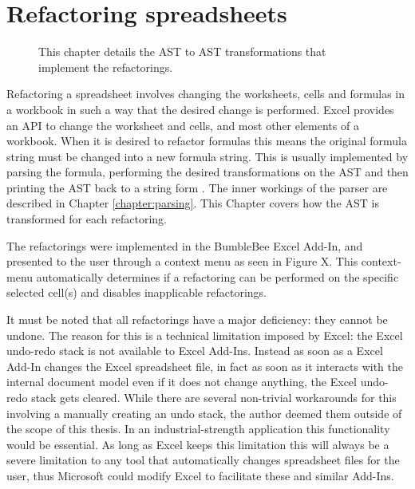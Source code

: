 
\chapter{Refactoring spreadsheets}
\label{chapter:implementingrefactorings}

\noindent
\begin{figure}[h!]
\hspace*{0.003\textwidth}

\caption{This chapter details the AST to AST transformations that implement the refactorings.}
\end{figure}

Refactoring a spreadsheet involves changing the worksheets, cells and formulas in a workbook in such a way that the desired change is performed.
Excel provides an API to change the worksheet and cells, and most other elements of a workbook.
When it is desired to refactor formulas this means the original formula string must be changed into a new formula string.
This is usually implemented by parsing the formula, performing the desired transformations on the AST and then printing the AST back to a string form \cite{fowler1999refactoring}.
The inner workings of the parser are described in Chapter \ref{chapter:parsing}.
This Chapter covers how the AST is transformed for each refactoring.

The refactorings were implemented in the BumbleBee Excel Add-In, and presented to the user through a context menu as seen in Figure X.
This context-menu automatically determines if a refactoring can be performed on the specific selected cell(s) and disables inapplicable refactorings.

It must be noted that all refactorings have a major deficiency: they cannot be undone. \fw
The reason for this is a technical limitation imposed by Excel: the Excel undo-redo stack is not available to Excel Add-Ins.
Instead as soon as a Excel Add-In changes the Excel spreadsheet file, in fact as soon as it interacts with the internal document model even if it does not change anything, the Excel undo-redo stack gets cleared.
While there are several non-trivial workarounds for this involving a manually creating an undo stack, the author deemed them outside of the scope of this thesis.
In an industrial-strength application this functionality would be essential.
As long as Excel keeps this limitation this will always be a severe limitation to any tool that automatically changes spreadsheet files for the user, thus Microsoft could modify Excel to facilitate these and similar Add-Ins. \fw

